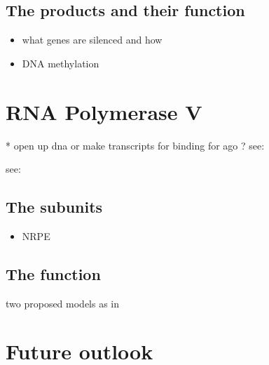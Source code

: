 \documentclass[a4paper, twocolumn]{article}
\begin{document}
\subsection{The products and their function}


\begin{itemize}
	\item what genes are silenced and how
	\item DNA methylation 
\end{itemize}

\cite{PIKAARD2008}


\section{RNA Polymerase V}
* open up dna or make transcripts for binding for ago ? 
see: \cite{Daxinger_2008}

see: \cite{wierzbick1}

\subsection{The subunits}
\cite{Wendte2017}
\cite{subunits}
\begin{itemize}
		\item NRPE
\end{itemize}

\cite{REAM2009}

\subsection{The function}

two proposed models as in \cite{PIKAARD2008}




\section{Future outlook}





\end{document}
